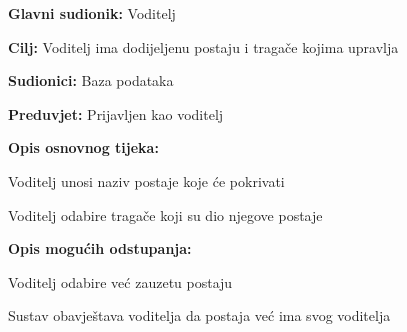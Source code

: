 					
					\noindent {}
					\begin{packed_item}
						
						\item \textbf{Glavni sudionik: }Voditelj
						\item  \textbf{Cilj:} Voditelj ima dodijeljenu postaju i tragače kojima upravlja
						\item  \textbf{Sudionici:} Baza podataka
						\item  \textbf{Preduvjet:} Prijavljen kao voditelj
						\item  \textbf{Opis osnovnog tijeka:}
						
						\item[] \begin{packed_enum}
							
							\item Voditelj unosi naziv postaje koje će pokrivati
							\item Voditelj odabire tragače koji su dio njegove postaje
							
							\end{packed_enum}
						\item  \textbf{Opis mogućih odstupanja:}
						
						\item[] \begin{packed_item}
							
							\item[2.a] Voditelj odabire već zauzetu postaju
							\item[] \begin{packed_enum}
								
								\item Sustav obavještava voditelja da postaja već ima svog voditelja
								
							\end{packed_enum}
							
						\end{packed_item}
						
						
					\end{packed_item}
					
